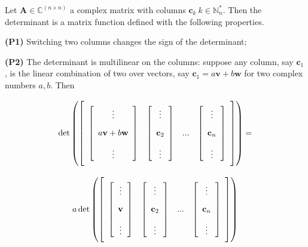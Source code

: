 \begin{definition}\label{def:determinant} Let $\mathbf{A}\in\mathbb{C}^{(n\times n)}$ a complex matrix with columns $\mathbf{c}_k\ k\in\mathbb{N}_n^*$. Then the determinant is a matrix function defined with the following properties.

\noindent\textbf{(P1)} Switching two columns changes the sign of the determinant;

\noindent\textbf{(P2)} The determinant is multilinear on the columns: suppose any column, say $\mathbf{c}_1$, is the linear combination of two over vectors, say $\mathbf{c}_1 = a\mathbf{v} + b\mathbf{w}$ for two complex numbers $a,b$. Then

\begin{gather}
	\det\left(\left[\raisebox{15mm}{} \begin{array}{cccc} \left[\begin{array}{c} \vdots \\[3mm] a\mathbf{v} + b\mathbf{w} \\[3mm] \vdots \end{array}\right] & \left[\begin{array}{c} \vdots \\[3mm] \mathbf{c}_2 \\[3mm] \vdots \end{array}\right] & ... & \left[\begin{array}{c} \vdots \\[3mm] \mathbf{c}_n \\[3mm] \vdots \end{array}\right]\end{array}\right]\right) = \nonumber \\[3mm]
%
	a\det\left(\left[\raisebox{15mm}{} \begin{array}{cccc} \left[\begin{array}{c} \vdots \\[3mm] \mathbf{v} \\[3mm] \vdots \end{array}\right] & \left[\begin{array}{c} \vdots \\[3mm] \mathbf{c}_2 \\[3mm] \vdots \end{array}\right] & ... & \left[\begin{array}{c} \vdots \\[3mm] \mathbf{c}_n \\[3mm] \vdots \end{array}\right]\end{array}\right]\right) 

\end{gather}
\end{definition}
